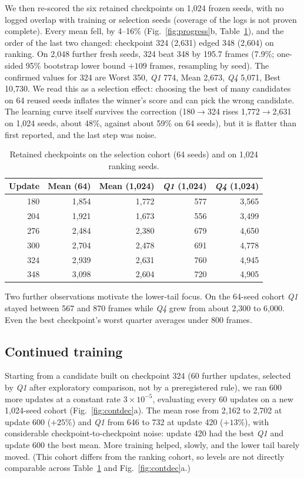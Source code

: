\documentclass[journal]{IEEEtran}
\newcommand{\Q}[1]{\textit{Q#1}}
\begin{document}
We then re-scored the six retained checkpoints on 1{,}024 frozen seeds, with no logged overlap with training or selection seeds (coverage of the logs is not proven complete). Every mean fell, by 4--16\% (Fig.~\ref{fig:progress}b, Table~\ref{tab:retained}), and the order of the last two changed: checkpoint 324 (2{,}631) edged 348 (2{,}604) on ranking. On 2{,}048 further fresh seeds, 324 beat 348 by 195.7 frames (7.9\%; one-sided 95\% bootstrap lower bound $+109$ frames, resampling by seed). The confirmed values for 324 are Worst 350, \Q{1} 774, Mean 2{,}673, \Q{4} 5{,}071, Best 10{,}730. We read this as a selection effect: choosing the best of many candidates on 64 reused seeds inflates the winner's score and can pick the wrong candidate. The learning curve itself survives the correction (180$\to$324 rises 1{,}772$\to$2{,}631 on 1{,}024 seeds, about 48\%, against about 59\% on 64 seeds), but it is flatter than first reported, and the last step was noise.

\begin{table}[t]
\caption{Retained checkpoints on the selection cohort (64 seeds) and on 1{,}024 ranking seeds.}\label{tab:retained}
\centering
\small
\begin{tabular}{@{}rrrrr@{}}
\toprule
Update & Mean (64) & Mean (1{,}024) & \Q{1} (1{,}024) & \Q{4} (1{,}024) \\
\midrule
180 & 1{,}854 & 1{,}772 & 577 & 3{,}565 \\
204 & 1{,}921 & 1{,}673 & 556 & 3{,}499 \\
276 & 2{,}484 & 2{,}380 & 679 & 4{,}650 \\
300 & 2{,}704 & 2{,}478 & 691 & 4{,}778 \\
324 & 2{,}939 & 2{,}631 & 760 & 4{,}945 \\
348 & 3{,}098 & 2{,}604 & 720 & 4{,}905 \\
\bottomrule
\end{tabular}
\end{table}

Two further observations motivate the lower-tail focus. On the 64-seed cohort \Q{1} stayed between 567 and 870 frames while \Q{4} grew from about 2{,}300 to 6{,}000. Even the best checkpoint's worst quarter averages under 800 frames.

\subsection{Continued training}\label{sec:continue}
Starting from a candidate built on checkpoint 324 (60 further updates, selected by \Q{1} after exploratory comparison, not by a preregistered rule), we ran 600 more updates at a constant rate $3\times10^{-5}$, evaluating every 60 updates on a new 1{,}024-seed cohort (Fig.~\ref{fig:contdec}a). The mean rose from 2{,}162 to 2{,}702 at update 600 ($+25\%$) and \Q{1} from 646 to 732 at update 420 ($+13\%$), with considerable checkpoint-to-checkpoint noise: update 420 had the best \Q{1} and update 600 the best mean. More training helped, slowly, and the lower tail barely moved. (This cohort differs from the ranking cohort, so levels are not directly comparable across Table~\ref{tab:retained} and Fig.~\ref{fig:contdec}a.)
\end{document}

